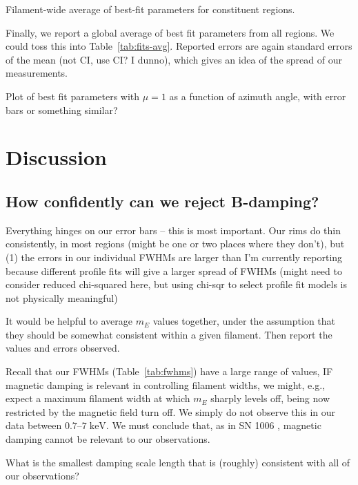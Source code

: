 \documentclass[iop, apj, numberedappendix, twocolappendix]{emulateapj}
\newcommand*{\mt}{\mathrm}
\newcommand*{\unit}[1]{\;\mt{#1}}  %
\begin{document}
\begin{table*}
    \scriptsize
    \centering
    \caption{Filament-wide average of best-fit parameters for constituent regions.
    \label{tab:fits-avg}}
    
\end{table*}

Finally, we report a global average of best fit parameters from all regions.
We could toss this into Table~\ref{tab:fits-avg}.  Reported errors are
again standard errors of the mean (not CI, use CI? I dunno), which gives an
idea of the spread of our measurements.

Plot of best fit parameters with $\mu=1$ as a function of azimuth angle, with
error bars or something similar?

\section{Discussion}

\subsection{How confidently can we reject B-damping?}

Everything hinges on our error bars -- this is most important.  Our rims do
thin consistently, in most regions (might be one or two places where they
don't), but (1) the errors in our individual FWHMs are larger than I'm
currently reporting because different profile fits will give a larger spread of
FWHMs (might need to consider reduced chi-squared here, but using chi-sqr to
select profile fit models is not physically meaningful)

It would be helpful to average $m_E$ values together, under the
assumption that they should be somewhat consistent within a given filament.
Then report the values and errors observed.

Recall that our FWHMs (Table~\ref{tab:fwhms}) have a large range of values,
IF magnetic damping is relevant in controlling filament widths, we might, e.g.,
expect a maximum filament width at which $m_E$ sharply levels off, being now
restricted by the magnetic field turn off.  We simply do not observe this in
our data between $0.7$--$7 \unit{keV}$.  We must conclude that, as in SN 1006
, magnetic damping cannot be relevant to our
observations.

What is the smallest damping scale length that is (roughly) consistent with all 
of our observations?
\end{document}
